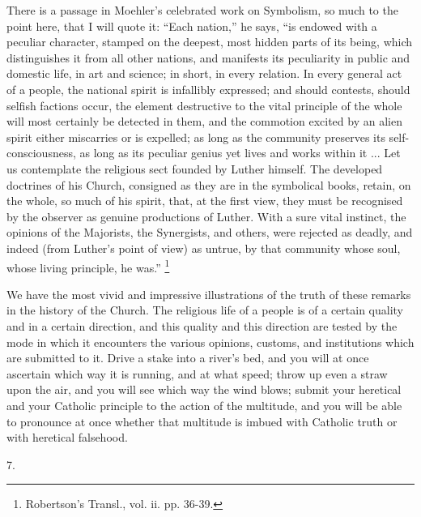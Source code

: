 There is a passage in Moehler's celebrated work on Symbolism, so
much to the point here, that I will quote it: ``Each nation,''
he says, ``is endowed with a peculiar character, stamped on the
deepest, most hidden parts of its being, which distinguishes it from
all other nations, and manifests its peculiarity in public and
domestic life, in art and science; in short, in every relation. In
every general act of a people, the national spirit is infallibly
expressed; and should contests, should selfish factions occur, the
element destructive to the vital principle of the whole will most
certainly be detected in them, and the commotion excited by an alien
spirit either miscarries or is expelled; as long as the community
preserves its self-consciousness, as long as its peculiar genius yet
lives and works within it ... Let us contemplate the religious sect founded by Luther himself.
The developed doctrines of his Church, consigned as they are in the
symbolical books, retain, on the whole, so much of his spirit, that,
at the first view, they must be recognised by the observer as genuine
productions of Luther. With a sure vital instinct, the opinions of the
Majorists, the Synergists, and others, were rejected as deadly, and
indeed (from Luther's point of view) as untrue, by that community
whose soul, whose living principle, he was.'' \footnote{Robertson's Transl., vol. ii. pp. 36-39.}

We have the most vivid and impressive illustrations of the truth of
these remarks in the history of the Church. The religious life of a
people is of a certain quality and in a certain direction, and this
quality and this direction are tested by the mode in which it
encounters the various opinions, customs, and institutions which are
submitted to it. Drive a stake into a river's bed, and you will at
once ascertain which way it is running, and at what speed; throw up
even a straw upon the air, and you will see which way the wind blows;
submit your heretical and your Catholic principle to the action of the
multitude, and you will be able to pronounce at once whether that
multitude is imbued with Catholic truth or with heretical falsehood.

7.


